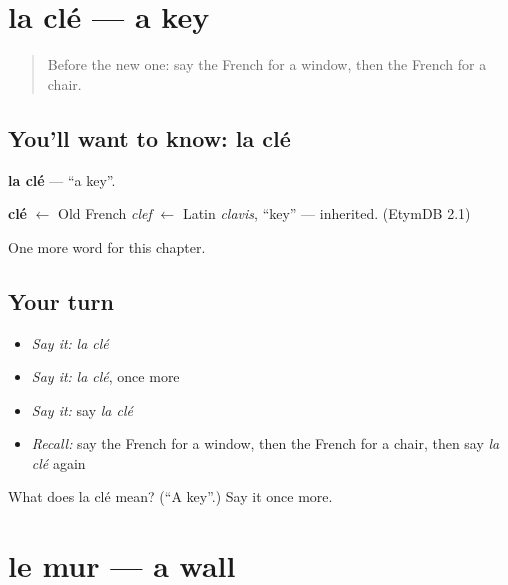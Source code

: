 \section[la clé]{la clé — a key}

\label{lesson:FR-C73-cle}



\begin{quote}
Before the new one: say the French for a window, then the French for a chair.
\end{quote}

\subsection*{You'll want to know: la clé}
\textbf{la clé} — \textquotedblleft{}a key\textquotedblright{}.

\begin{cousinweb}
\textbf{clé} $\leftarrow$ Old French \emph{clef} $\leftarrow$ Latin \emph{clavis}, \textquotedblleft{}key\textquotedblright{} — inherited. (EtymDB 2.1)
\end{cousinweb}

\begin{grammarlens}[title={What you've built}]
One more word for this chapter.
\end{grammarlens}

\subsection*{Your turn}
\begin{itemize}
\raggedright
  \item \emph{Say it:} \emph{la clé}
  \item \emph{Say it:} \emph{la clé}, once more
  \item \emph{Say it:} say \emph{la clé}
  \item \emph{Recall:} say the French for a window, then the French for a chair, then say \emph{la clé} again
\end{itemize}

\begin{tcolorbox}[breakable,colback=teal!4,colframe=teal!35!black,title={Before you move on}]
What does la clé mean? (\textquotedblleft{}A key\textquotedblright{}.) Say it once more.
\end{tcolorbox}
\section[le mur]{le mur — a wall}

